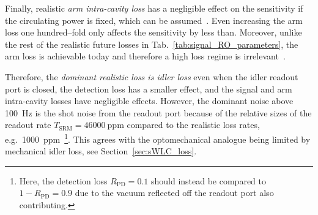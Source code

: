 Finally, realistic \emph{arm intra-cavity loss} has a negligible effect on the sensitivity if the circulating power is fixed, which can be assumed~\cite{}. Even increasing the arm loss one hundred--fold only affects the sensitivity by less than. Moreover, unlike the rest of the realistic future losses in Tab.~\ref{tab:signal_RO_parameters}, the arm loss is achievable today and therefore a high loss regime is irrelevant~\cite{}. %

Therefore, the \emph{dominant realistic loss is idler loss} even when the idler readout port is closed, the detection loss has a smaller effect, and the signal and arm intra-cavity losses have negligible effects. However, the dominant noise above 100~Hz is the shot noise from the readout port because of the relative sizes of the readout rate $T_\text{SRM}=46000~\text{ppm}$ compared to the realistic loss rates, e.g.\ 1000~ppm~\footnote{Here, the detection loss $R_\text{PD}=0.1$ should instead be compared to $1-R_\text{PD}=0.9$ due to the vacuum reflected off the readout port also contributing.}. This agrees with the optomechanical analogue being limited by mechanical idler loss, see Section~\ref{sec:sWLC_loss}. 

